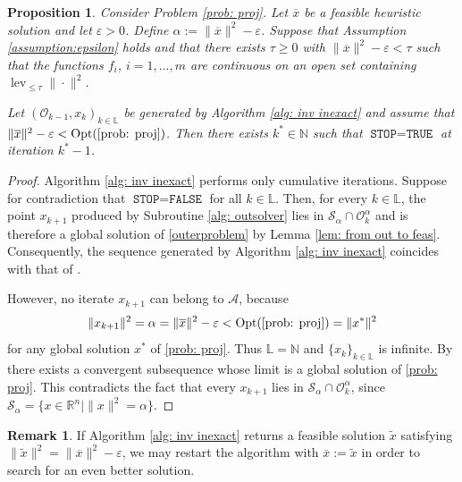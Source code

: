 \documentclass[12pt]{amsart}
\theoremstyle{plain}
\newtheorem{proposition}[theorem]{Proposition}
\theoremstyle{definition}
\newtheorem{remark}[theorem]{Remark}
\begin{document}
\begin{proposition}
\label{always}
Consider Problem \eqref{prob: proj}. Let \(\overline{x}\) be a feasible heuristic solution and let \(\varepsilon > 0\). Define \(\alpha := \|\overline{x}\|^2 - \varepsilon\). Suppose that Assumption \ref{assumption:epsilon} holds and that there exists \(\tau \ge 0\) with \(\|\overline{x}\|^2 - \varepsilon < \tau\) such that the functions \(f_i\), \(i=1,...,m\) are continuous on an open set containing \(\operatorname{lev}_{\le \tau} \|\cdot\|^2\).

Let \((\mathcal{O}_{k-1}, x_k)_{k \in \mathbb{L}}\) be generated by Algorithm \ref{alg: inv inexact} and assume that \(\|\overline{x}\|^2 - \varepsilon < \operatorname{Opt}(\eqref{prob: proj})\). Then there exists \(k^* \in \mathbb{N}\) such that \(\texttt{STOP} = \texttt{TRUE}\) at iteration \(k^* - 1\).
\end{proposition}

\begin{proof}
Algorithm \ref{alg: inv inexact} performs only cumulative iterations. Suppose for contradiction that \(\texttt{STOP} = \texttt{FALSE}\) for all \(k \in \mathbb{L}\). Then, for every \(k \in \mathbb{L}\), the point \(x_{k+1}\) produced by Subroutine \ref{alg: outsolver} lies in \(\mathcal{S}_\alpha \cap \mathcal{O}_k^\alpha\) and is therefore a global solution of \eqref{outerproblem} by Lemma \ref{lem: from out to feas}. Consequently, the sequence generated by Algorithm \ref{alg: inv inexact} coincides with that of \cite[Algorithm 1]{bednarczuk2026outer}.

However, no iterate \(x_{k+1}\) can belong to \(\mathcal{A}\), because
\[
\|x_{k+1}\|^2 = \alpha = \|\overline{x}\|^2 - \varepsilon < \operatorname{Opt}(\eqref{prob: proj}) = \|x^*\|^2
\]
for any global solution \(x^*\) of \eqref{prob: proj}. Thus \(\mathbb{L} = \mathbb{N}\) and \(\{x_k\}_{k \in \mathbb{L}}\) is infinite. By \cite[Theorem 2]{bednarczuk2026outer} there exists a convergent subsequence whose limit is a global solution of \eqref{prob: proj}. This contradicts the fact that every \(x_{k+1}\) lies in \(\mathcal{S}_\alpha \cap \mathcal{O}_k^\alpha\), since \(\mathcal{S}_\alpha = \{x \in \mathbb{R}^n \mid \|x\|^2 = \alpha\}\).
\end{proof}

\begin{remark}
\label{rem}
If Algorithm \ref{alg: inv inexact} returns a feasible solution \(\tilde{x}\) satisfying \(\|\tilde{x}\|^2 = \|\overline{x}\|^2 - \varepsilon\), we may restart the algorithm with \(\overline{x} := \tilde{x}\) in order to search for an even better solution.
\end{remark}	
		
\end{document}
